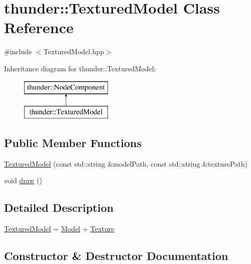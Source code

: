 \hypertarget{classthunder_1_1_textured_model}{}\section{thunder\+:\+:Textured\+Model Class Reference}
\label{classthunder_1_1_textured_model}


{\ttfamily \#include $<$Textured\+Model.\+hpp$>$}

Inheritance diagram for thunder\+:\+:Textured\+Model\+:\begin{figure}[H]
\begin{center}
\leavevmode
\includegraphics[height=2.000000cm]{classthunder_1_1_textured_model}
\end{center}
\end{figure}
\subsection*{Public Member Functions}
\begin{DoxyCompactItemize}
\item 
\mbox{\hyperlink{classthunder_1_1_textured_model_af40176391ea488d5c72e5eba9ad2fd43}{Textured\+Model}} (const std\+::string \&model\+Path, const std\+::string \&texture\+Path)
\item 
void \mbox{\hyperlink{classthunder_1_1_textured_model_a20535970e84f2debb4cb2a5eabdfa93c}{draw}} ()
\end{DoxyCompactItemize}


\subsection{Detailed Description}
\mbox{\hyperlink{classthunder_1_1_textured_model}{Textured\+Model}} = \mbox{\hyperlink{classthunder_1_1_model}{Model}} + \mbox{\hyperlink{classthunder_1_1_texture}{Texture}} 

\subsection{Constructor \& Destructor Documentation}
\mbox{\label{classthunder_1_1_textured_model_af40176391ea488d5c72e5eba9ad2fd43}} 

